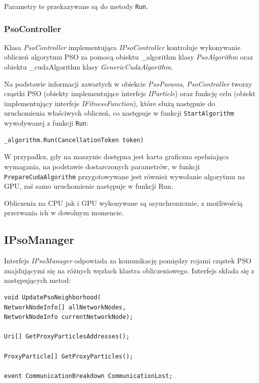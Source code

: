 \documentclass[12pt, twoside, openany, abstract=on]{report}
\theoremstyle{definition}
\begin{document}
Parametry te przekazywane są do metody \texttt{Run}.

\subsubsection{PsoController}
Klasa \textit{PsoController} implementująca \textit{IPsoController} kontroluje wykonywanie obliczeń algorytmu PSO za pomocą obiektu \_algorithm klasy \textit{PsoAlgorithm} oraz obiektu \_cudaAlgorithm klasy \textit{GenericCudaAlgorithm}. 

Na podstawie informacji zawartych w obiekcie \textit{PsoParams}, \textit{PsoController} tworzy cząstki PSO (obiekty implementujące interfejs \textit{IParticle}) oraz funkcję celu (obiekt implementujący interfejs \textit{IFitnessFunction}), które służą następnie do uruchomienia właściwych obliczeń, co następuje w funkcji \texttt{StartAlgorithm} wywoływanej z funkcji \texttt{Run}:

\begin{lstlisting}[frame=single]
_algorithm.Run(CancellationToken token)
\end{lstlisting}

W przypadku, gdy na maszynie dostępna jest karta graficzna spełniająca wymagania, na podstawie dostarczonych parametrów, w funkcji \texttt{PrepareCudaAlgorithm} przygotowywane jest również wywołanie algorytmu na GPU, zaś samo uruchomienie następuje w funkcji Run.

Obliczenia na CPU jak i GPU wykonywane są asynchronicznie, z możliwością przerwania ich w dowolnym momencie.


\subsection{IPsoManager}

Interfejs \textit{IPsoManager} odpowiada za komunikację pomiędzy rojami cząstek PSO znajdującymi się na różnych węzłach klastra obliczeniowego. Interfejs składa się z następujących metod:

\begin{lstlisting}[frame=single]
void UpdatePsoNeighborhood(
NetworkNodeInfo[] allNetworkNodes, 
NetworkNodeInfo currentNetworkNode);
  
Uri[] GetProxyParticlesAddresses();

ProxyParticle[] GetProxyParticles();

event CommunicationBreakdown CommunicationLost;
\end{lstlisting}
\end{document}

